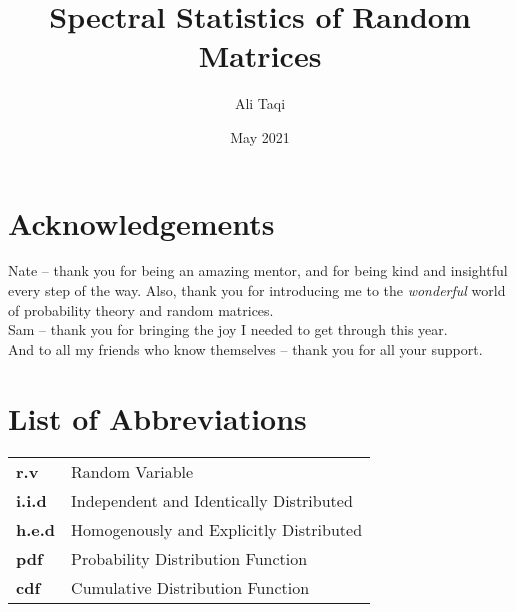 \documentclass[12pt,twoside]{reedthesis}
\title{Spectral Statistics of Random Matrices}
\author{Ali Taqi}
\date{May 2021}
\begin{document}
  \maketitle
  \frontmatter %
  \pagestyle{empty} %

     \chapter*{Acknowledgements}
 Nate -- thank you for being an amazing mentor, and for being kind and insightful every step of the way.
 Also, thank you for introducing me to the \textit{wonderful} world of probability theory and random matrices. \\

 \noindent Sam -- thank you for bringing the joy I needed to get through this year. \\

 \noindent And to all my friends who know themselves -- thank you for all your support.


    \chapter*{List of Abbreviations}

	\begin{table}[h]
	\centering %
	\begin{tabular}{ll}
		\textbf{r.v}  	  &  Random Variable \\
		\textbf{i.i.d}  	&  Independent and Identically Distributed \\
		\textbf{h.e.d}    &  Homogenously and Explicitly Distributed \\
		\textbf{pdf}      &  Probability Distribution Function \\
		\textbf{cdf}      &  Cumulative Distribution Function \\
		\end{tabular}
	\end{table}

    \tableofcontents

    \listoftables \hfill
\end{document}
